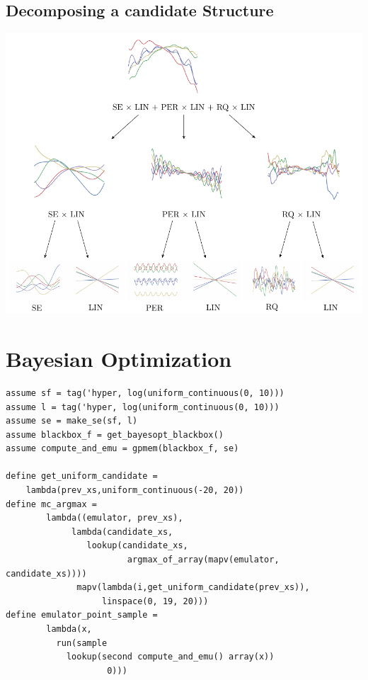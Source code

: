 \documentclass[a0,portrait]{a0poster}
\begin{document}
\begin{multicols}{3}
\subsection*{Decomposing a candidate Structure}
\begin{center}\vspace{1cm}
\includegraphics[width=0.7\linewidth]{parseTree.pdf}
\end{center}\vspace{1cm}
 
\vfill
\columnbreak
\section*{Bayesian Optimization}

\begin{minipage}{\linewidth}
\begin{lstlisting}[frame=single,label=alg:structureVent,caption=Venture Code for Bayesian Optimization,mathescape]
assume sf = tag('hyper, log(uniform_continuous(0, 10)))
assume l = tag('hyper, log(uniform_continuous(0, 10)))
assume se = make_se(sf, l)
assume blackbox_f = get_bayesopt_blackbox()
assume compute_and_emu = gpmem(blackbox_f, se)

define get_uniform_candidate =  
	lambda(prev_xs,uniform_continuous(-20, 20))
define mc_argmax =
        lambda((emulator, prev_xs),
             lambda(candidate_xs,
                lookup(candidate_xs,
                        argmax_of_array(mapv(emulator, candidate_xs))))
              mapv(lambda(i,get_uniform_candidate(prev_xs)),
                   linspace(0, 19, 20)))
define emulator_point_sample = 
        lambda(x,
          run(sample
            lookup(second compute_and_emu() array(x))
                    0)))


\end{lstlisting}
\end{minipage}
\end{multicols}
\end{document}
